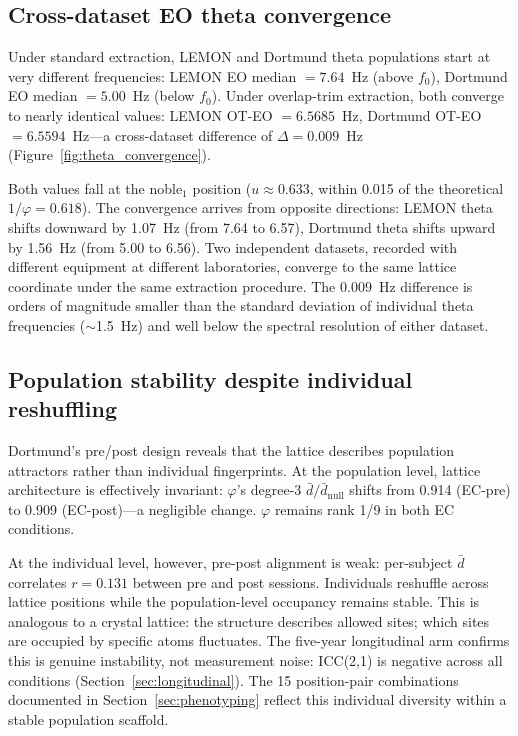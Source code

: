 \documentclass[11pt,a4paper]{article}
\newcommand{\phisym}{\varphi}
\newcommand{\fzero}{f_0}
\begin{document}
\subsection{Cross-dataset EO theta convergence}
\label{sec:theta_convergence}

Under standard extraction, LEMON and Dortmund theta populations start at very different frequencies: LEMON EO median $= 7.64$~Hz (above $\fzero$), Dortmund EO median $= 5.00$~Hz (below $\fzero$). Under overlap-trim extraction, both converge to nearly identical values: LEMON OT-EO $= 6.5685$~Hz, Dortmund OT-EO $= 6.5594$~Hz---a cross-dataset difference of $\Delta = 0.009$~Hz (Figure~\ref{fig:theta_convergence}).

Both values fall at the noble$_1$ position ($u \approx 0.633$, within 0.015 of the theoretical $1/\phisym = 0.618$). The convergence arrives from opposite directions: LEMON theta shifts downward by 1.07~Hz (from 7.64 to 6.57), Dortmund theta shifts upward by 1.56~Hz (from 5.00 to 6.56). Two independent datasets, recorded with different equipment at different laboratories, converge to the same lattice coordinate under the same extraction procedure. The $0.009$~Hz difference is orders of magnitude smaller than the standard deviation of individual theta frequencies ($\sim$1.5~Hz) and well below the spectral resolution of either dataset.

\subsection{Population stability despite individual reshuffling}
\label{sec:pop_stability}

Dortmund's pre/post design reveals that the lattice describes population attractors rather than individual fingerprints. At the population level, lattice architecture is effectively invariant: $\phisym$'s degree-3 $\bar{d}/\bar{d}_{\text{null}}$ shifts from 0.914 (EC-pre) to 0.909 (EC-post)---a negligible change. $\phisym$ remains rank 1/9 in both EC conditions.

At the individual level, however, pre-post alignment is weak: per-subject $\bar{d}$ correlates $r = 0.131$ between pre and post sessions. Individuals reshuffle across lattice positions while the population-level occupancy remains stable. This is analogous to a crystal lattice: the structure describes allowed sites; which sites are occupied by specific atoms fluctuates. The five-year longitudinal arm confirms this is genuine instability, not measurement noise: ICC(2,1) is negative across all conditions (Section~\ref{sec:longitudinal}). The 15 position-pair combinations documented in Section~\ref{sec:phenotyping} reflect this individual diversity within a stable population scaffold.
\end{document}
